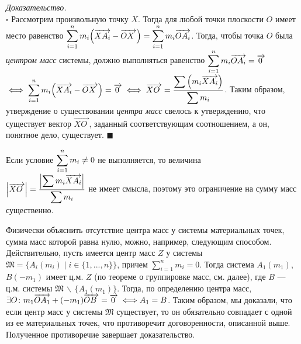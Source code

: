 \documentclass[14pt]{extarticle}
\let\vecarrow\overrightarrow
\theoremstyle{definition}
\theoremstyle{theorem}
\renewenvironment{proof}
    {\noindent \textit{Доказательство.}\\
	\indent $\square$}
	{ $\blacksquare$\\ }
\newenvironment{note}
    {\noindent {\normalfont\fontsize{14}{14}\textbf{\textit{Примечание.}}}}
\DeclarePairedDelimiter\abs{\lvert}{\rvert}
\begin{document}
{
\begin{proof}
    Рассмотрим произвольную точку $X$. Тогда для любой  точки
	плоскости $O$ имеет место равенство $\mathlarger{\sum_{i=1}^{n}
	m_i  \Big(\vecarrow{XA_i} - \vecarrow{OX_{\, \,}}\Big) = \sum_{i=1}^{n} 
	m_i  \vecarrow{OA_i}}$. Тогда, чтобы точка $O$ была 
	\textit{центром масс} системы, должно выполняться равенство
	$\mathlarger{\sum_{i=1}^{n} 
	m_i  \vecarrow{OA_i}} = \vecarrow{0_{\,}}$ $\iff \mathlarger{\sum_{i=1}^{n} m_i 
	\Big(\vecarrow{XA_i} - \vecarrow{OX_{\, \,}}\Big) = \vecarrow{0_{\,}} \iff 
    \vecarrow{XO_{\;}} = \frac{\displaystyle \sum \Big(m_i
	\vecarrow{XA_i} \Big)}{\displaystyle\sum m_i}}$. Таким образом, %
    утверждение о существовании \textit{центра масс} свелось к утверждению, что существует
	вектор $\vecarrow{XO_{\;}}$, заданный соответствующим соотношением, а он,
	понятное дело, существует.
\end{proof}
\par}

\begin{note}
	{
    Если условие $\mathlarger{\sum_{i=1}^{n} m_i \ne 0}$ не выполняется,
	то величина \\
	$\mathlarger{\abs*{\vecarrow{XO_{\;}}} = \frac{\displaystyle
    \abs*{\sum m_i \vecarrow{XA_i}}}{\displaystyle \sum m_i}}$
    не имеет смысла, поэтому это ограничение на сумму  масс %
    существенно. 
    \par} \vspace{2mm}
    \noindent
    Физически объяснить отсутствие центра масс у системы материальных точек,
    сумма масс которой равна нулю, можно, например, следующим способом. \\
    Действительно, пусть имеется
    центр масс \(Z\) у системы \(\mathfrak{M} = \big\{A_i(m_i) \mid i \in 
    \{1, ..., n\}\big\}\), причем  \(\displaystyle \sum_{i = 1}^{n}
    m_i = 0\). Тогда система %
    \(A_1(m_1)\), \(B(-m_1)\) имеет ц.м. \(Z\) 
    (по теореме о группировке масс, см. далее), где \(B\) --- ц.м. системы
    \(\mathfrak{M} \, \backslash \, \{ A_1(m_1) \} \). 
    Тогда, по определению центра масс,
    \(\exists O \colon m_1 \vecarrow{OA_1} + (-m_1) \vecarrow{OB_{\, \,}} = 
    \vecarrow{0_{\,}} \iff\\ A_1 = B\). Таким образом, мы доказали, что если центр
    масс у системы \(\mathfrak{M}\) существует, то он обязательно совпадает с одной
    из ее материальных точек, что противоречит договоренности, описанной выше.
    Полученное противоречие завершает доказательство. 
    

\end{note}
\end{document}
